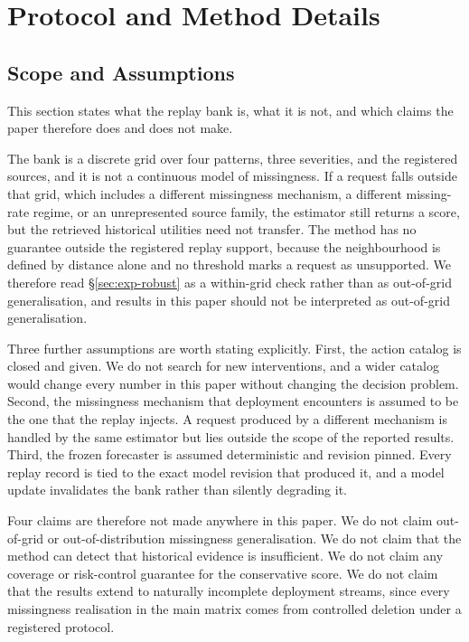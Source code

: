 \documentclass{article}
\begin{document}
\section{Protocol and Method Details}
\label{app:protocol}
\subsection{Scope and Assumptions}
\label{app:scope}
This section states what the replay bank is, what it is not, and which claims the paper
therefore does and does not make.

The bank is a discrete grid over four patterns, three severities, and the registered sources,
and it is not a continuous model of missingness. If a request falls outside that grid, which
includes a different missingness mechanism, a different missing-rate regime, or an
unrepresented source family, the estimator still returns a score, but the retrieved
historical utilities need not transfer. The method has no guarantee outside the registered
replay support, because the neighbourhood is defined by distance alone and no threshold marks
a request as unsupported. We therefore read \S\ref{sec:exp-robust} as a within-grid check
rather than as out-of-grid generalisation, and results in this paper should not be interpreted
as out-of-grid generalisation.

Three further assumptions are worth stating explicitly. First, the action catalog is closed and
given. We do not search for new interventions, and a wider catalog would change every number
in this paper without changing the decision problem. Second, the missingness mechanism that
deployment encounters is assumed to be the one that the replay injects. A request produced by
a different mechanism is handled by the same estimator but lies outside the scope of the
reported results. Third, the frozen forecaster is assumed deterministic and revision pinned.
Every replay record is tied to the exact model revision that produced it, and a model update
invalidates the bank rather than silently degrading it.

Four claims are therefore not made anywhere in this paper. We do not claim out-of-grid or
out-of-distribution missingness generalisation. We do not claim that the method can detect
that historical evidence is insufficient. We do not claim any coverage or risk-control
guarantee for the conservative score. We do not claim that the results extend to naturally
incomplete deployment streams, since every missingness realisation in the main matrix comes
from controlled deletion under a registered protocol.
\end{document}
